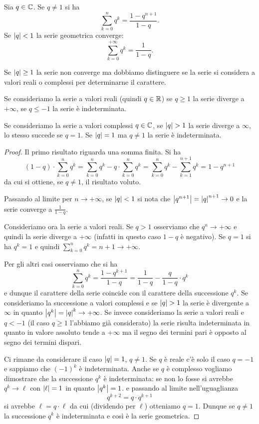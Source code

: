 \begin{theorem}
\label{th:serie_geometrica}%
\mymark{***}%
%
%
Sia $q\in {\mathbb C}$. Se $q\neq 1$ si ha
\[
 \sum_{k=0}^n q^k  = \frac{1-q^{n+1}\!\!\!\!\!\!}{1-q}.
\]
Se ${\left|q\right|} < 1$ la serie geometrica converge:
\[
 \sum_{k=0}^{+\infty} q^k = \frac{1}{1-q}.
\]

Se ${\left|q\right|}\ge 1$ la serie non converge
ma dobbiamo distinguere se la serie
si considera a valori reali o complessi
per determinarne il carattere.

Se consideriamo la serie a valori reali
(quindi $q\in {\mathbb R}$) se $q\ge 1$ la serie
diverge a $+\infty$,
se $q\le -1$ la serie è indeterminata.

Se consideriamo la serie a valori complessi
$q\in {\mathbb C}$, se ${\left|q\right|}>1$ la serie diverge
a $\infty$, lo stesso succede se $q=1$.
Se ${\left|q\right|}=1$ ma $q\neq 1$ la serie
è indeterminata.
\end{theorem}
%
\begin{proof}
Il primo risultato riguarda una somma finita.
Si ha
\[
  (1-q)\cdot \sum_{k=0}^n q^k
  = \sum_{k=0}^n q^k - q \cdot \sum_{k=0}^n q^k
  = \sum_{k=0}^n q^k - \sum_{k=1}^{n+1} q^k
  = 1 - q^{n+1}
\]
da cui si ottiene, se $q\neq 1$, il risultato voluto.

Passando al limite per $n\to +\infty$, se ${\left|q\right|} < 1 $
si nota che ${\left|q^{n+1}\right|} = {\left|q\right|}^{n+1} \to 0$
e la serie converge a $\frac 1{1-q}$.

Consideriamo ora la serie a valori reali.
Se $q>1$ osserviamo che
$q^n\to +\infty$ e quindi la serie diverge a $+\infty$
(infatti in questo caso $1-q$ è negativo).
Se $q=1$ si ha $q^k=1$ e quindi
$\displaystyle\sum_{k=0}^n q^k = n+1 \to +\infty$.

Per gli altri casi osserviamo che si ha
\[
  \sum_{k=0}^n q^k = \frac{1-q^{k+1}}{1-q}
  = \frac{1}{1-q} - \frac{q}{1-q}\cdot q^k
\]
e dunque il carattere della serie coincide
con il carattere della successione $q^k$.
Se consideriamo la successione a valori
complessi e se ${\left|q\right|}>1$ la serie è divergente
a $\infty$ in quanto
${\left|q^k\right|}={\left|q\right|}^k\to +\infty$.
Se invece consideriamo la serie a valori reali
e $q<-1$ (il caso $q\ge 1$ l'abbiamo già considerato)
la serie risulta indeterminata in quanto
in valore assoluto tende a $+\infty$ ma
il segno dei termini pari è opposto al segno dei termini
dispari.

Ci rimane da considerare il caso ${\left|q\right|}=1$, $q\neq 1$.
Se $q$ è reale c'è solo il caso $q=-1$ e sappiamo
che $(-1)^k$ è indeterminata.
Anche se $q$ è complesso vogliamo dimostrare
che la successione $q^k$ è indeterminata:
se non lo fosse si avrebbe $q^k\to \ell$
con ${\left|\ell\right|}=1$ in quanto ${\left|q^k\right|}=1$.
e passando al limite nell'uguaglianza
\[
  q^{k+2} = q\cdot q^{k+1}
\]
si avrebbe $\ell = q\cdot \ell$ da cui
(dividendo per $\ell$) otteniamo $q=1$.
Dunque se $q\neq 1$ la successione $q^k$
è indeterminata e così è la serie
geometrica.
\end{proof}

